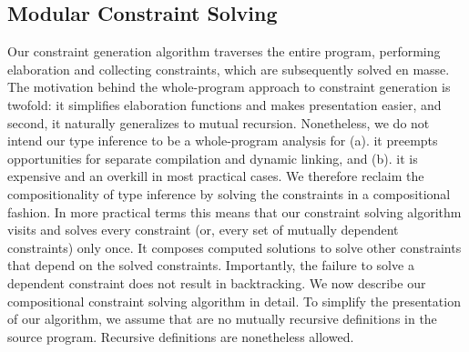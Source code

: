 


\subsection{Modular Constraint Solving}
\label{sec:fb-constraintsolving}

Our constraint generation algorithm traverses the entire program,
performing elaboration and collecting constraints, which are
subsequently solved en masse. The motivation behind the whole-program
approach to constraint generation is twofold: it simplifies
elaboration functions and makes presentation easier, and second, it
naturally generalizes to mutual recursion. Nonetheless, we do not
intend our type inference to be a whole-program analysis for (a). it
preempts opportunities for separate compilation and dynamic linking,
and (b). it is expensive and an overkill in most practical cases. We
therefore reclaim the compositionality of type inference by solving
the constraints in a compositional fashion. In more practical terms
this means that our constraint solving algorithm visits and solves
every constraint (or, every set of mutually dependent constraints)
only once. It composes computed solutions to solve other constraints
that depend on the solved constraints. Importantly, the failure to
solve a dependent constraint does not result in backtracking. We now
describe our compositional constraint solving algorithm in detail. To
simplify the presentation of our algorithm, we assume that are no
mutually recursive definitions in the source program. Recursive
definitions are nonetheless allowed.

